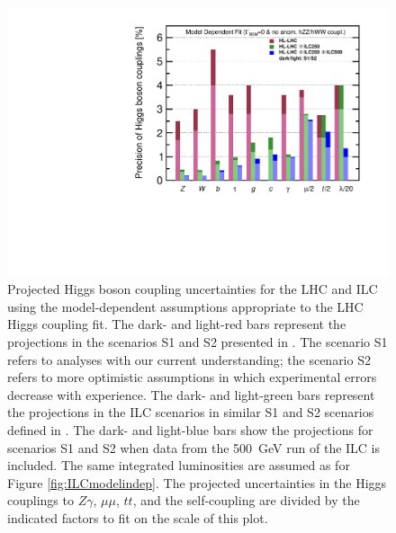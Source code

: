 \documentclass[%
 reprint,
 amsmath,amssymb,
 aps,
]{revtex4-1}
\begin{document}
\begin{figure}
\begin{center}
\includegraphics[width=0.99\hsize]{figures/ModeldepSummary.pdf}
\caption{Projected Higgs boson coupling uncertainties for the LHC and
  ILC
using the model-dependent assumptions appropriate to the LHC Higgs
coupling fit.   The
dark- and light-red bars represent the projections in the scenarios S1
and S2 presented in \cite{Yellow}.  The scenario S1 refers to
analyses with our current understanding; the scenario S2 refers to
more optimistic assumptions in which experimental errors decrease with
experience.  The dark- and light-green bars represent the
projections in the ILC scenarios in similar S1 and S2 scenarios defined in \cite{ILCforESS}. 
 The dark- and light-blue bars show the projections for scenarios S1 and S2
when
data from the 500~GeV run of the ILC is included. The same integrated luminosities are assumed as for Figure \ref{fig:ILCmodelindep}. The projected uncertainties in the Higgs couplings to $Z\gamma$, $\mu\mu$, $tt$, and the self-coupling are divided by the indicated factors to fit on the scale of this plot.}
 \label{fig:ILCLHC}
\end{center}
\vspace{-0.7cm}
\end{figure}
\end{document}
